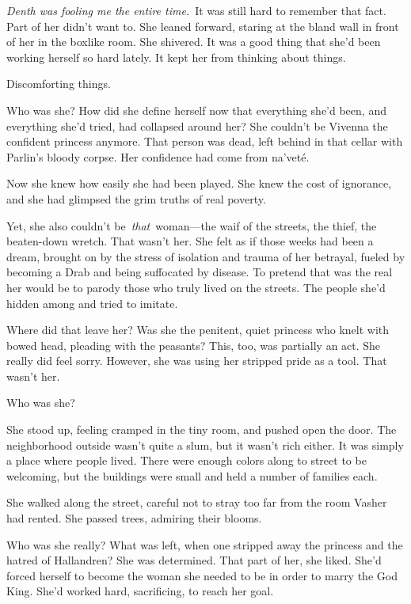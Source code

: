 \textit{Denth was fooling me the entire time.}~It was still hard to remember that fact. Part of her didn’t want to. She leaned forward, staring at the bland wall in front of her in the boxlike room. She shivered. It was a good thing that she’d been working herself so hard lately. It kept her from thinking about things.

Discomforting things.

Who was she? How did she define herself now that everything she’d been, and everything she’d tried, had collapsed around her? She couldn’t be Vivenna the confident princess anymore. That person was dead, left behind in that cellar with Parlin’s bloody corpse. Her confidence had come from na’veté.

Now she knew how easily she had been played. She knew the cost of ignorance, and she had glimpsed the grim truths of real poverty.

Yet, she also couldn’t be~\textit{that}~woman—the waif of the streets, the thief, the beaten-down wretch. That wasn’t her. She felt as if those weeks had been a dream, brought on by the stress of isolation and trauma of her betrayal, fueled by becoming a Drab and being suffocated by disease. To pretend that was the real her would be to parody those who truly lived on the streets. The people she’d hidden among and tried to imitate.

Where did that leave her? Was she the penitent, quiet princess who knelt with bowed head, pleading with the peasants? This, too, was partially an act. She really did feel sorry. However, she was using her stripped pride as a tool. That wasn’t her.

Who was she?

She stood up, feeling cramped in the tiny room, and pushed open the door. The neighborhood outside wasn’t quite a slum, but it wasn’t rich either. It was simply a place where people lived. There were enough colors along to street to be welcoming, but the buildings were small and held a number of families each.

She walked along the street, careful not to stray too far from the room Vasher had rented. She passed trees, admiring their blooms.

Who was she really? What was left, when one stripped away the princess and the hatred of Hallandren? She was determined. That part of her, she liked. She’d forced herself to become the woman she needed to be in order to marry the God King. She’d worked hard, sacrificing, to reach her goal.

